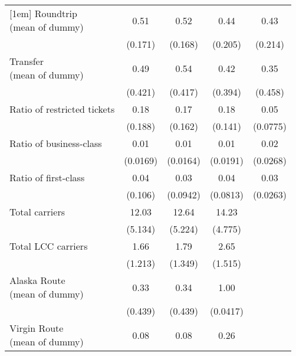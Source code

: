 \begin{table}[htbp]
\begin{tabular}{l*{4}{c}}
[1em]
\Centerstack{Roundtrip \\ (mean of dummy)}&        0.51         &        0.52         &        0.44         &        0.43         \\
            &     (0.171)         &     (0.168)         &     (0.205)         &     (0.214)         \\
[1em]
\Centerstack{Transfer \\ (mean of dummy)}&        0.49         &        0.54         &        0.42         &        0.35         \\
            &     (0.421)         &     (0.417)         &     (0.394)         &     (0.458)         \\
[1em]
Ratio of restricted tickets&        0.18         &        0.17         &        0.18         &        0.05         \\
            &     (0.188)         &     (0.162)         &     (0.141)         &    (0.0775)         \\
[1em]
Ratio of business-class&        0.01         &        0.01         &        0.01         &        0.02         \\
            &    (0.0169)         &    (0.0164)         &    (0.0191)         &    (0.0268)         \\
[1em]
Ratio of first-class&        0.04         &        0.03         &        0.04         &        0.03         \\
            &     (0.106)         &    (0.0942)         &    (0.0813)         &    (0.0263)         \\
[1em]
Total carriers&       12.03         &       12.64         &       14.23         &                     \\
            &     (5.134)         &     (5.224)         &     (4.775)         &                     \\
[1em]
Total LCC carriers&        1.66         &        1.79         &        2.65         &                     \\
            &     (1.213)         &     (1.349)         &     (1.515)         &                     \\
[1em]
\Centerstack{Alaska Route \\ (mean of dummy)}&        0.33         &        0.34         &        1.00         &                     \\
            &     (0.439)         &     (0.439)         &    (0.0417)         &                     \\
[1em]
\Centerstack{Virgin Route \\ (mean of dummy)}&        0.08         &        0.08         &        0.26         &                     \\

\end{tabular}
\end{table}
